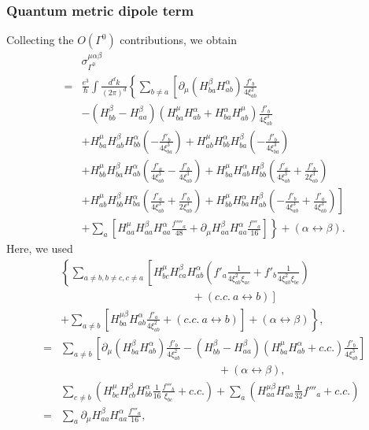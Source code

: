 \documentclass[twocolumn,superscriptaddress]{revtex4-1}
\begin{document}
\subsubsection{Quantum metric dipole term}\label{app:QMD}
Collecting the $O(\Gamma^0)$ contributions, we obtain
\begin{align}
&\sigma_{\Gamma^0}^{\mu\alpha\beta}\nonumber \\
=&\frac{e^3}{\hbar}\int \frac{d^d k}{(2\pi)^d}\left\{\sum_{b\neq a}\left[\partial_\mu (H_{ba}^\beta H_{ab}^\alpha) \frac{f'_b}{4\xi_{ab}^2}\right.\right.\nonumber \\
&-(H_{bb}^\beta-H_{aa}^\beta)(H_{ba}^\mu H_{ab}^\alpha+H_{ba}^\alpha H_{ab}^\mu) \frac{f'_b}{4\xi_{ab}^3}\nonumber\\
  &+H_{ba}^\mu H_{ab}^{\beta} H_{bb}^\alpha \left(-\frac{f'_b}{4\xi_{ba}^3}\right) +H_{ab}^\mu H_{bb}^{\alpha} H_{ba}^\beta \left(-\frac{f'_b}{4\xi_{ba}^3}\right) \nonumber\\
   &+H_{bb}^\mu H_{ba}^\beta H_{ab}^\alpha \left(\frac{f'_a}{4\xi_{ab}^3}-\frac{f'_b}{4\xi_{ab}^3}\right) +H_{ba}^\mu H_{ab}^{\alpha} H_{bb}^\beta \left(\frac{f'_a}{4\xi_{ab}^3}+\frac{f'_b}{2\xi_{ab}^3}\right)\nonumber\\
  &\left.+H_{ab}^\mu H_{bb}^\beta H_{ba}^\alpha \left(\frac{f'_a}{4\xi_{ab}^3}+\frac{f'_b}{2\xi_{ab}^3}\right)  +H_{bb}^\mu H_{ba}^{\alpha} H_{ab}^\beta \left(-\frac{f'_b}{4\xi_{ab}^3}+\frac{f'_a}{4\xi_{ab}^3}\right)\right]\nonumber\\
  &\left.+\sum_{a}\left[H_{aa}^\mu H_{aa}^\beta H_{aa}^\alpha \frac{f''''_a}{48}+ \partial_\mu H_{aa}^{\beta} H_{aa}^\alpha \frac{f'''_a}{16}\right] \right\}+(\alpha \leftrightarrow \beta) .
\end{align}
Here, we used
\begin{align}
  &\left\{\sum_{a\neq b,b\neq c,c\neq a}\left[H_{bc}^\mu H_{ca}^\beta H_{ab}^\alpha \left(f'_a\frac{1}{4\xi_{ab}^2\xi_{ac}}+f'_b\frac{1}{4\xi_{ab}^2\xi_{bc}} \right)\right.\right. \nonumber \\
  &\left. \hspace{5cm}+(c.c.\ a\leftrightarrow b)\right]\nonumber \\
  &\left.+\sum_{a\neq b}\left[H_{ba}^{\mu\beta} H_{ab}^\alpha \frac{f'_a}{4\xi_{ab}^2}+(c.c.\ a\leftrightarrow b)\right]+(\alpha\leftrightarrow \beta)\right\}, \nonumber \\
  =&\sum_{a\neq b}\left[\partial_\mu (H_{ba}^\beta H_{ab}^\alpha) \frac{f'_b}{4\xi_{ab}^2}-(H_{bb}^\beta-H_{aa}^\beta)(H_{ba}^\mu H_{ab}^\alpha+c.c.) \frac{f'_b}{4\xi_{ab}^3}\right]\nonumber \\
  &\hspace{6cm}+(\alpha\leftrightarrow \beta),\\
&\sum_{c\neq b}\left(H_{bc}^\mu H_{cb}^\beta H_{bb}^\alpha \frac{1}{16}\frac{f'''_b}{\xi_{bc}}+c.c.\right)+\sum_a \left(H_{aa}^{\mu\beta} H_{aa}^\alpha \frac{1}{32}f'''_a+c.c.\right)\nonumber \\
=&\sum_{a} \partial_\mu H_{aa}^{\beta} H_{aa}^\alpha \frac{f'''_a}{16}, 
\end{align}
\end{document}
